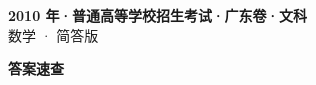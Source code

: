 \documentclass[zihao=-4, a4paper]{ctexart}
\begin{document}
\begin{center}
  {\Large\bfseries 2010 年·普通高等学校招生考试·广东卷·文科}\\[4pt]
  {\large 数学 · 简答版}
\end{center}
\medskip
{}

\clearpage
{}
\begin{center}{\Large\bfseries 答案速查}\end{center}
\medskip

\end{document}
